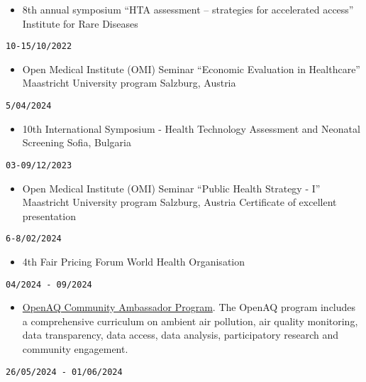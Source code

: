 \documentclass[
  12pt,
  letterpaper,
  DIV=11,
  numbers=noendperiod]{scrartcl}
\providecommand{\tightlist}{%
  \setlength{\itemsep}{0pt}\setlength{\parskip}{0pt}}\usepackage{longtable,booktabs,array}
\begin{document}
\begin{itemize}
\tightlist
\item
  8th annual symposium ``HTA assessment -- strategies for accelerated
  access'' \textbar{} Institute for Rare Diseases
\end{itemize}

\texttt{10-15/10/2022}

\begin{itemize}
\tightlist
\item
  Open Medical Institute (OMI) Seminar \textbar{} ``Economic Evaluation
  in Healthcare'' \textbar{} Maastricht University program \textbar{}
  Salzburg, Austria
\end{itemize}

\texttt{5/04/2024}

\begin{itemize}
\tightlist
\item
  10th International Symposium - Health Technology Assessment and
  Neonatal Screening \textbar{} Sofia, Bulgaria
\end{itemize}

\texttt{03-09/12/2023}

\begin{itemize}
\tightlist
\item
  Open Medical Institute (OMI) Seminar \textbar{} ``Public Health
  Strategy - I'' \textbar{} Maastricht University program \textbar{}
  Salzburg, Austria \textbar{} Certificate of excellent presentation
\end{itemize}

\texttt{6-8/02/2024}

\begin{itemize}
\tightlist
\item
  4th Fair Pricing Forum \textbar{} World Health Organisation
\end{itemize}

\texttt{04/2024\ -\ 09/2024}

\begin{itemize}
\tightlist
\item
  \href{https://openaq.org/about/people/kostadin-kostadinov/}{OpenAQ
  Community Ambassador Program}. \textbar{} The OpenAQ program includes
  a comprehensive curriculum on ambient air pollution, air quality
  monitoring, data transparency, data access, data analysis,
  participatory research and community engagement.
\end{itemize}

\texttt{26/05/2024\ -\ 01/06/2024}
\end{document}
